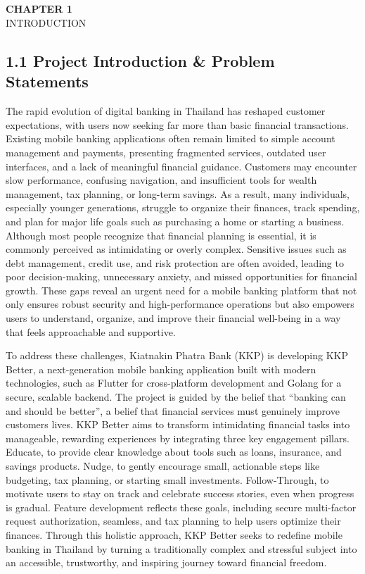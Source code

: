 \subsection{}\label{section}

\textbf{CHAPTER 1\\
}INTRODUCTION

\subsection{\texorpdfstring{\textbf{1.1 Project Introduction \& Problem
Statements}}{1.1 Project Introduction \& Problem Statements}}\label{project-introduction-problem-statements}

The rapid evolution of digital banking in Thailand has reshaped customer
expectations, with users now seeking far more than basic financial
transactions. Existing mobile banking applications often remain limited
to simple account management and payments, presenting fragmented
services, outdated user interfaces, and a lack of meaningful financial
guidance. Customers may encounter slow performance, confusing
navigation, and insufficient tools for wealth management, tax planning,
or long-term savings. As a result, many individuals, especially younger
generations, struggle to organize their finances, track spending, and
plan for major life goals such as purchasing a home or starting a
business. Although most people recognize that financial planning is
essential, it is commonly perceived as intimidating or overly complex.
Sensitive issues such as debt management, credit use, and risk
protection are often avoided, leading to poor decision-making,
unnecessary anxiety, and missed opportunities for financial growth.
These gaps reveal an urgent need for a mobile banking platform that not
only ensures robust security and high-performance operations but also
empowers users to understand, organize, and improve their financial
well-being in a way that feels approachable and supportive.

To address these challenges, Kiatnakin Phatra Bank (KKP) is developing
KKP Better, a next-generation mobile banking application built with
modern technologies, such as Flutter for cross-platform development and
Golang for a secure, scalable backend. The project is guided by the
belief that ``banking can and should be better'', a belief that
financial services must genuinely improve customers\textquotesingle{}
lives. KKP Better aims to transform intimidating financial tasks into
manageable, rewarding experiences by integrating three key engagement
pillars. Educate, to provide clear knowledge about tools such as loans,
insurance, and savings products. Nudge, to gently encourage small,
actionable steps like budgeting, tax planning, or starting small
investments. Follow-Through, to motivate users to stay on track and
celebrate success stories, even when progress is gradual. Feature
development reflects these goals, including secure multi-factor request
authorization, seamless, and tax planning to help users optimize their
finances. Through this holistic approach, KKP Better seeks to redefine
mobile banking in Thailand by turning a traditionally complex and
stressful subject into an accessible, trustworthy, and inspiring journey
toward financial freedom.

